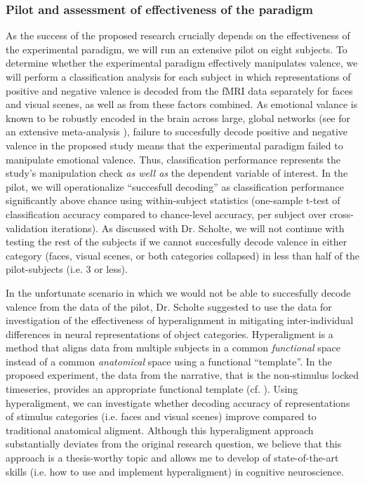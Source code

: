 \documentclass[12pt,a4paper]{article}\usepackage[]{graphicx}\usepackage[]{color}
\begin{document}
\subsubsection{Pilot and assessment of effectiveness of the paradigm}

As the success of the proposed research crucially depends on the effectiveness of the experimental paradigm, we will run an extensive pilot on eight subjects. To determine whether the experimental paradigm effectively manipulates valence, we will perform a classification analysis for each subject in which representations of positive and negative valence is decoded from the fMRI data separately for faces and visual scenes, as well as from these factors combined. As emotional valance is known to be robustly encoded in the brain across large, global networks (see for an extensive meta-analysis \citealp{lindquist2015}), failure to succesfully decode positive and negative valence in the proposed study means that the experimental paradigm failed to manipulate emotional valence. Thus, classification performance represents the study's manipulation check \emph{as well as} the dependent variable of interest. In the pilot, we will operationalize ``succesfull decoding'' as classification performance significantly above chance using within-subject statistics (one-sample t-test of classification accuracy compared to chance-level accuracy, per subject over cross-validation iterations). As discussed with Dr. Scholte, we will not continue with testing the rest of the subjects if we cannot succesfully decode valence in either category (faces, visual scenes, or both categories collapsed) in less than half of the pilot-subjects (i.e. 3 or less). 

In the unfortunate scenario in which we would not be able to succesfully decode valence from the data of the pilot, Dr. Scholte suggested to use the data for investigation of the effectiveness of hyperalignment \citep{hasson2004} in mitigating inter-individual differences in neural representations of object categories. Hyperaligment is a method that aligns data from multiple subjects in a common \emph{functional} space instead of a common \emph{anatomical} space using a functional ``template''. In the proposed experiment, the data from the narrative, that is the non-stimulus locked timeseries, provides an appropriate functional template (cf. \citealp{hanke2014}). Using hyperaligment, we can investigate whether decoding accuracy of representations of stimulus categories (i.e. faces and visual scenes) improve compared to traditional anatomical aligment. Although this hyperaligment approach substantially deviates from the original research question, we believe that this approach is a thesis-worthy topic and allows me to develop of state-of-the-art skills (i.e. how to use and implement hyperaligment) in cognitive neuroscience.
\end{document}
